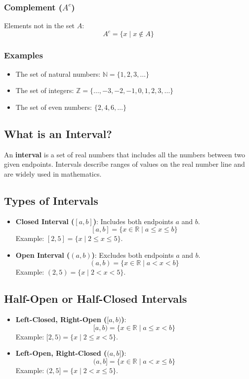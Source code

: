 \subsubsection{Complement (\(A^c\))}
Elements not in the set \(A\):
\[
    A^c = \{x \mid x \notin A\}
\]
\subsubsection{Examples}
\begin{itemize}
    \item The set of natural numbers: \(\mathbb{N} = \{1, 2, 3, \dots\} \)
    \item The set of integers: \(\mathbb{Z} = \{\dots, -3, -2, -1, 0, 1, 2, 3, \dots\} \)
    \item The set of even numbers: \(\{2, 4, 6, \dots\} \)
\end{itemize}

\subsection{What is an Interval?}
An \textbf{interval} is a set of real numbers that includes all the numbers between two given endpoints.
Intervals describe ranges of values on the real number line and are widely used in mathematics.

\subsection{Types of Intervals}
\begin{itemize}
    \item \textbf{Closed Interval (\([a, b]\))}: Includes both endpoints \(a\) and \(b\).
    \[
    [a, b] = \{x \in \mathbb{R} \mid a \leq x \leq b\}
    \]
    Example: \([2, 5] = \{x \mid 2 \leq x \leq 5\} \).
    \vspace{5pt}

    \item \textbf{Open Interval (\((a, b)\))}: Excludes both endpoints \(a\) and \(b\).
    \[
    (a, b) = \{x \in \mathbb{R} \mid a < x < b\}
    \]
    Example: \((2, 5) = \{x \mid 2 < x < 5\} \).
\end{itemize}

\subsection{Half-Open or Half-Closed Intervals}
\begin{itemize}
    \item \textbf{Left-Closed, Right-Open (\([a, b)\))}:
    \[
    [a, b) = \{x \in \mathbb{R} \mid a \leq x < b\}
    \]
    Example: \([2, 5) = \{x \mid 2 \leq x < 5\} \).
    \vspace{5pt}

    \item \textbf{Left-Open, Right-Closed (\((a, b]\))}:
    \[
    (a, b] = \{x \in \mathbb{R} \mid a < x \leq b\}
    \]
    Example: \((2, 5] = \{x \mid 2 < x \leq 5\} \).
\end{itemize}

